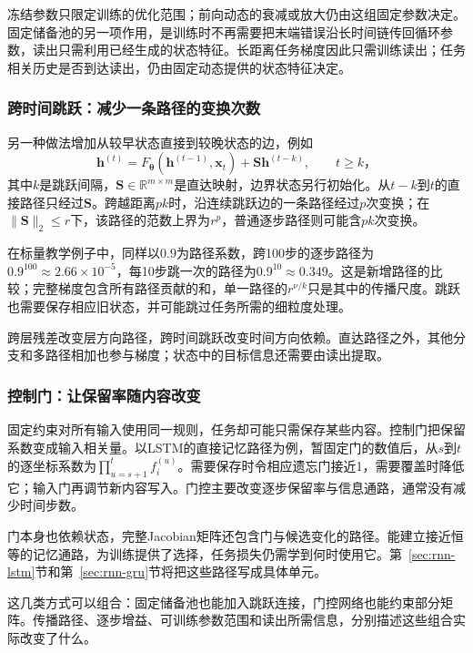 冻结参数只限定训练的优化范围；前向动态的衰减或放大仍由这组固定参数决定。固定储备池的另一项作用，是训练时不再需要把末端错误沿长时间链传回循环参数，读出只需利用已经生成的状态特征。长距离任务梯度因此只需训练读出；任务相关历史是否到达读出，仍由固定动态提供的状态特征决定。

\subsubsection{跨时间跳跃：减少一条路径的变换次数}
\label{sec:rnn-temporal-skips}

另一种做法增加从较早状态直接到较晚状态的边，例如
\begin{equation}
  \bm h^{(t)}=F_{\bm\theta}(\bm h^{(t-1)},\bm x_t)
       +\bm S\bm h^{(t-k)},\qquad t\geq k\text{，}
  \label{eq:rnn-temporal-skip}
\end{equation}
其中$k$是跳跃间隔，$\bm S\in\mathbb R^{m\times m}$是直达映射，边界状态另行初始化。从$t-k$到$t$的直接路径只经过$\bm S$。跨越距离$pk$时，沿连续跳跃边的一条路径经过$p$次变换；在$\lVert\bm S\rVert_2\leq r$下，该路径的范数上界为$r^p$，普通逐步路径则可能含$pk$次变换。

在标量教学例子中，同样以$0.9$为路径系数，跨100步的逐步路径为$0.9^{100}\approx2.66\times10^{-5}$，每10步跳一次的路径为$0.9^{10}\approx0.349$。这是新增路径的比较；完整梯度包含所有路径贡献的和，单一路径的$r^{\nu/k}$只是其中的传播尺度。跳跃也需要保存相应旧状态，并可能跳过任务所需的细粒度处理。

跨层残差改变层方向路径，跨时间跳跃改变时间方向依赖。直达路径之外，其他分支和多路径相加也参与梯度；状态中的目标信息还需要由读出提取。

\subsubsection{控制门：让保留率随内容改变}
\label{sec:rnn-gated-memory-path}

固定约束对所有输入使用同一规则，任务却可能只需保存某些内容。控制门把保留系数变成输入相关量。以LSTM的直接记忆路径为例，暂固定门的数值后，从$s$到$t$的逐坐标系数为$\prod_{u=s+1}^{t}f_i^{(u)}$。需要保存时令相应遗忘门接近1，需要覆盖时降低它；输入门再调节新内容写入。门控主要改变逐步保留率与信息通路，通常没有减少时间步数。

门本身也依赖状态，完整Jacobian矩阵还包含门与候选变化的路径。能建立接近恒等的记忆通路，为训练提供了选择，任务损失仍需学到何时使用它。第~\ref{sec:rnn-lstm}节和第~\ref{sec:rnn-gru}节将把这些路径写成具体单元。

这几类方式可以组合：固定储备池也能加入跳跃连接，门控网络也能约束部分矩阵。传播路径、逐步增益、可训练参数范围和读出所需信息，分别描述这些组合实际改变了什么。


